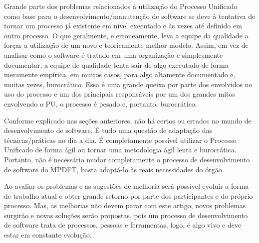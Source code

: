 \documentclass[
	article,			%
	11pt,				%
	oneside,			%
	a4paper,			%
	english,			%
	brazil,				%
	sumario=tradicional
	]{abntex2}
\begin{document}
Grande parte dos problemas relacionados à utilização do Processo Unificado como
base para o desenvolvimento/manutenção de software se deve à tentativa de tornar
um processo já existente em nível executado e às vezes até definido em outro
processo. O que geralmente, e erroneamente, leva a equipe da qualidade a forçar
a utilização de um novo e teoricamente melhor modelo. Assim, em vez de analisar
 como o software é tratado em uma organização e simplesmente documentar, a
equipe de qualidade tenta sair de algo executado de forma meramente empírica, em
muitos casos, para algo altamente documentado e, muitas vezes, burocrático. Essa
é uma grande queixa por parte dos envolvidos no uso do processo e um dos
principais responsáveis por um dos grandes mitos envolvendo o PU, o processo é
pesado e, portanto, burocrático.

Conforme explicado nas seções anteriores, não há certos ou errados no mundo de
desenvolvimento de software. É tudo uma questão de adaptação das
técnicas/práticas no dia a dia. É completamente possível utilizar o Processo
Unificado de forma ágil ou tornar uma metodologia ágil lenta e burocrática.
Portanto, não é necessário mudar completamente o processo de desenvolvimento de
software do MPDFT, basta adaptá-lo às reais necessidades do órgão.

Ao avaliar os problemas e as sugestões de melhoria será possível evoluir a forma
de trabalho atual e obter grande retorno por parte dos participantes e do
próprio processo. Mas, as melhorias não devem parar com este artigo, novos
problemas surgirão e novas soluções serão propostas, pois um processo de
desenvolvimento de software trata de processos, pessoas e ferramentas, logo, é
algo vivo e deve estar em constante evolução.

\postextual


\end{document}
